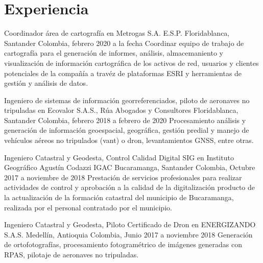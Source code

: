 \documentclass[]{friggeri-cv}
\begin{document}
\section{Experiencia}
\begin{entrylist}
  \entry
    
    {Coordinador área de cartografía en Metrogas S.A. E.S.P.}
    {Floridablanca, Santander Colombia, febrero 2020 a la fecha}
    {Coordinar equipo de trabajo de cartografía para el generación de informes, análisis, almacemaniento y visualización de información cartográfica de los activos de red, usuarios y clientes potenciales de la compañía a travéz de plataformas ESRI y herramientas de gestión y análisis de datos.\\}
\end{entrylist}

\begin{entrylist}
  \entry
    
    {Ingeniero de sistemas de información georreferenciados, piloto de aeronaves no tripuladas en Ecovalor S.A.S., Rúa Abogados y Consultores}
    {Floridablanca, Santander Colombia, febrero 2018 a febrero de 2020 }
    {Procesamiento análisis y generación de información geoespacial, geográfica, gestión predial y manejo de vehículos aéreos no tripulados (vant) o dron, levantamientos GNSS, entre otras.\\}
\end{entrylist}

\begin{entrylist}
  \entry
    
    {Ingeniero Catastral y Geodesta, Control Calidad Digital SIG en  Instituto Geográfico Agustín Codazzi IGAC}
    {Bucaramanga, Santander Colombia, Octubre 2017 a noviembre de 2018 }
    {Prestación de servicios profesionales para realizar actividades de control y aprobación a la calidad de la digitalización producto de la actualización de la formación catastral del municipio de Bucaramanga, realizada por el personal contratado por el municipio.\\}
\end{entrylist}

\begin{entrylist}
  \entry
    
    {Ingeniero Catastral y Geodesta, Piloto Certificado de Dron en ENERGIZANDO S.A.S.}
    {Medellín, Antioquia Colombia, Junio 2017 a noviembre 2018}
    {Generación de ortofotografías, procesamiento fotogramétrico de imágenes generadas con RPAS, pilotaje de aeronaves no tripuladas.\\}
\end{entrylist}
\end{document}
